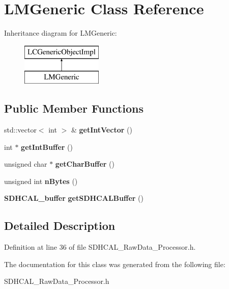 \section{L\-M\-Generic Class Reference}
\label{classLMGeneric}
Inheritance diagram for L\-M\-Generic\-:\begin{figure}[H]
\begin{center}
\leavevmode
\includegraphics[height=2.000000cm]{classLMGeneric}
\end{center}
\end{figure}
\subsection*{Public Member Functions}
\begin{DoxyCompactItemize}
\item 
std\-::vector$<$ int $>$ \& {\bfseries get\-Int\-Vector} ()\label{classLMGeneric_a0f55d4095ddbe5bce59fb8b2e37ec96a}

\item 
int $\ast$ {\bfseries get\-Int\-Buffer} ()\label{classLMGeneric_aa80986fb5ac9f0d33d43f62c68a9df7f}

\item 
unsigned char $\ast$ {\bfseries get\-Char\-Buffer} ()\label{classLMGeneric_a23b9f85c15757aab82ea033ba8b69a19}

\item 
unsigned int {\bfseries n\-Bytes} ()\label{classLMGeneric_a2dfe9b4627a9c71097146060e9450795}

\item 
{\bf S\-D\-H\-C\-A\-L\-\_\-buffer} {\bfseries get\-S\-D\-H\-C\-A\-L\-Buffer} ()\label{classLMGeneric_aa89db9dad9ed04e49a9f0f6c751f8906}

\end{DoxyCompactItemize}


\subsection{Detailed Description}


Definition at line 36 of file S\-D\-H\-C\-A\-L\-\_\-\-Raw\-Data\-\_\-\-Processor.\-h.



The documentation for this class was generated from the following file\-:\begin{DoxyCompactItemize}
\item 
S\-D\-H\-C\-A\-L\-\_\-\-Raw\-Data\-\_\-\-Processor.\-h\end{DoxyCompactItemize}
